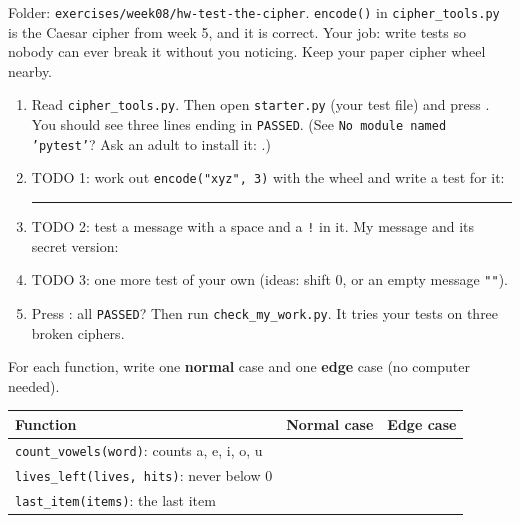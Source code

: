 \namedateline

\begin{core}
Folder: \texttt{exercises/week08/hw-test-the-cipher}. \texttt{encode()} in \texttt{cipher\_tools.py} is the Caesar cipher from week 5, and it is correct.
Your job: write tests so nobody can ever break it without you noticing. Keep your paper cipher wheel nearby.
\begin{enumerate}[leftmargin=1.4em]
  \item Read \texttt{cipher\_tools.py}. Then open \texttt{starter.py} (your test file) and press . You should see
        three lines ending in \texttt{PASSED}. (See \texttt{No module named 'pytest'}? Ask an adult to install it: .)
  \item TODO 1: work out \texttt{encode("xyz", 3)} with the wheel and write a test for it: \rule{3cm}{0.4pt}
  \item TODO 2: test a message with a space and a \texttt{!} in it. My message and its secret version:
  \item TODO 3: one more test of your own (ideas: shift 0, or an empty message \texttt{""}).
  \item Press : all \texttt{PASSED}? Then run \texttt{check\_my\_work.py}. It tries your tests on three broken ciphers.
\end{enumerate}
\end{core}

\begin{challenge}
For each function, write one \textbf{normal} case and one \textbf{edge} case (no computer needed).
\begin{center}
\renewcommand{\arraystretch}{2.2}
\begin{tabular}{@{}>{\raggedright\arraybackslash}p{6.4cm}p{3.6cm}p{3.6cm}@{}}
\toprule
\textbf{Function} & \textbf{Normal case} & \textbf{Edge case} \\ \midrule
\texttt{count\_vowels(word)}: counts a, e, i, o, u & & \\ \midrule
\texttt{lives\_left(lives, hits)}: never below 0 & & \\ \midrule
\texttt{last\_item(items)}: the last item & & \\
\bottomrule
\end{tabular}
\end{center}
\end{challenge}

